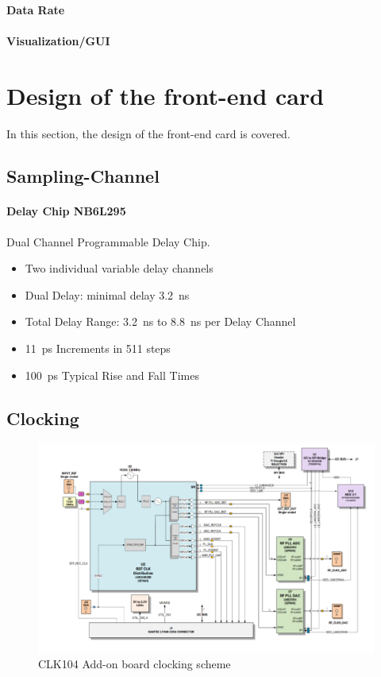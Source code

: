 \paragraph{Data Rate}
\paragraph{Visualization/GUI}
\newpage
\section{Design of the front-end card}
In this section, the design of the front-end card is covered.

\subsection{Sampling-Channel}
\paragraph{Delay Chip NB6L295}
Dual Channel Programmable Delay Chip.

\begin{itemize}
	\item Two individual variable delay channels
	\item Dual Delay: minimal delay \SI{3.2}{\nano \second}
	\item Total Delay Range: \SI{3.2}{\nano \second} to \SI{8.8}{\nano \second} per Delay Channel
	\item \SI{11}{\pico \second} Increments in 511 steps
	\item \SI{100}{\pico \second} Typical Rise and Fall Times
\end{itemize}

\subsection{Clocking}
\begin{figure}[H]
	\centering
	\includegraphics[width = \textwidth]{chap/03-work/img/clk104.png}
	\caption{CLK104 Add-on board clocking scheme}
	\label{fig:clk104}
\end{figure}

